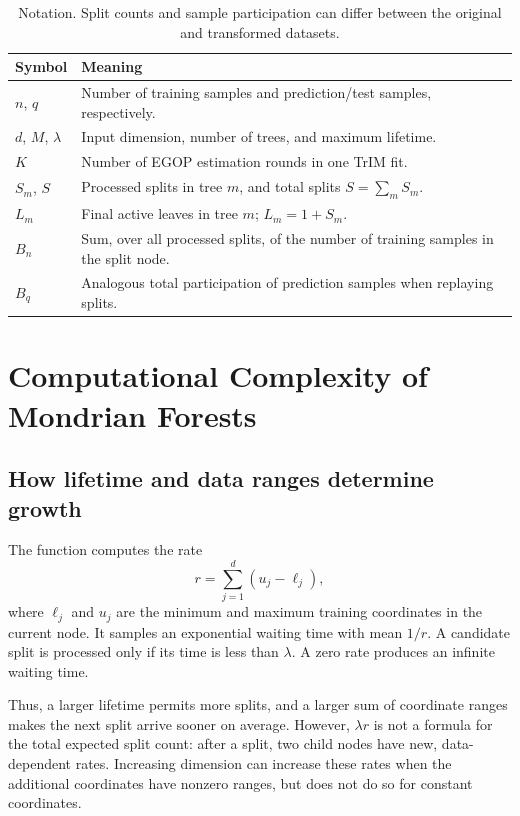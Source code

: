 \documentclass[11pt]{article}
\newcommand{\code}[1]{\texttt{\detokenize{#1}}}
\begin{document}
\begin{table}[htbp]
\centering\small
\begin{tabularx}{\textwidth}{lY}
\toprule
Symbol & Meaning \\
\midrule
$n$, $q$ & Number of training samples and prediction/test samples, respectively. \\
$d$, $M$, $\lambda$ & Input dimension, number of trees, and maximum lifetime. \\
$K$ & Number of EGOP estimation rounds in one TrIM fit. \\
$S_m$, $S$ & Processed splits in tree $m$, and total splits $S=\sum_m S_m$. \\
$L_m$ & Final active leaves in tree $m$; $L_m=1+S_m$. \\
$B_n$ & Sum, over all processed splits, of the number of training samples in the split node. \\
$B_q$ & Analogous total participation of prediction samples when replaying splits. \\
\bottomrule
\end{tabularx}
\caption{Notation. Split counts and sample participation can differ between the original and transformed datasets.}
\end{table}

\section{Computational Complexity of Mondrian Forests}

\subsection{How lifetime and data ranges determine growth}

The function \code{sample_cut} computes the rate
\begin{equation}
r=\sum_{j=1}^{d}(u_j-\ell_j),
\end{equation}
where $\ell_j$ and $u_j$ are the minimum and maximum training coordinates in the current node. It samples an exponential waiting time with mean $1/r$. A candidate split is processed only if its time is less than $\lambda$. A zero rate produces an infinite waiting time.

Thus, a larger lifetime permits more splits, and a larger sum of coordinate ranges makes the next split arrive sooner on average. However, $\lambda r$ is not a formula for the total expected split count: after a split, two child nodes have new, data-dependent rates. Increasing dimension can increase these rates when the additional coordinates have nonzero ranges, but does not do so for constant coordinates.
\end{document}
